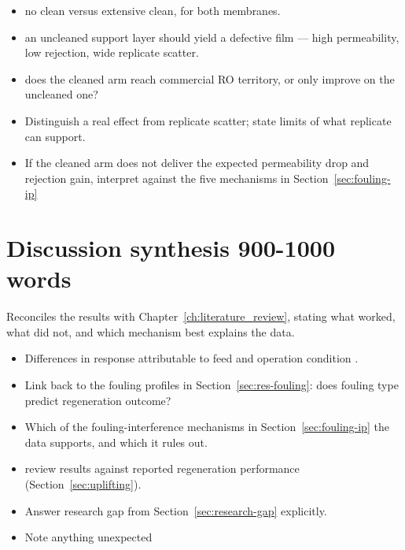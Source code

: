 \begin{itemize}
  \item no clean versus extensive clean, for both membranes.
  \item an uncleaned support layer should yield a defective film --- high permeability, low rejection, wide replicate scatter.
  \item does the cleaned arm reach commercial RO territory, or only improve on the uncleaned one? 
  \item Distinguish a real effect from replicate scatter; state  limits of what replicate can support.
  \item If the cleaned arm does not deliver the expected permeability drop and rejection gain, interpret  against the five mechanisms in Section~\ref{sec:fouling-ip}
\end{itemize}
\citet{Singh2006} 

\section{Discussion synthesis 900-1000 words}
\label{sec:res-synthesis}
Reconciles the results with Chapter~\ref{ch:literature_review}, stating what worked, what did not, and which mechanism best explains the data.
\begin{itemize}
  \item Differences in response attributable to feed and operation condition .
  \item Link back to the fouling profiles in Section~\ref{sec:res-fouling}: does fouling type predict regeneration outcome?
\end{itemize}

\begin{itemize}
  \item Which of the fouling-interference mechanisms in Section~\ref{sec:fouling-ip} the data supports, and which it rules out.
  \item review results against reported regeneration performance (Section~\ref{sec:uplifting}).
  \item Answer research gap from Section~\ref{sec:research-gap} explicitly.
  \item Note anything unexpected
\end{itemize}

